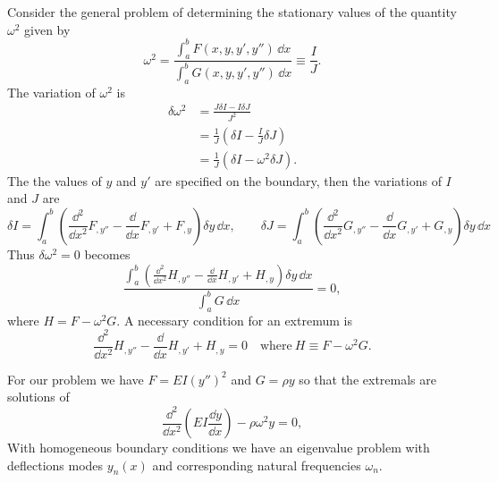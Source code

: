 \begin{Solution}
  Consider the general problem of determining the stationary values of
  the quantity $\omega^2$ given by
  \[
  \omega^2 = \frac{ \int_a^b F(x, y, y', y'' )\,\dd x }
  { \int_a^b G(x, y, y', y'' )\,\dd x }
  \equiv \frac{I}{J}.
  \]
  The variation of $\omega^2$ is
  \begin{align*}
    \delta \omega^2 
    &= \frac{ J \delta I - I \delta J }{J^2} \\
    &= \frac{1}{J} \left( \delta I - \frac{I}{J} \delta J \right) \\
    &= \frac{1}{J} \left( \delta I - \omega^2 \delta J \right).
  \end{align*}
  The the values of $y$ and $y'$ are specified on the boundary, then the 
  variations of $I$ and $J$ are
  \[
  \delta I = \int_a^b \left( \frac{\dd^2}{\dd x^2} F_{,y''} - \frac{\dd}{\dd x} F_{,y'}
    + F_{,y} \right) \delta y \,\dd x, \qquad
  \delta J = \int_a^b \left( \frac{\dd^2}{\dd x^2} G_{,y''} - \frac{\dd}{\dd x} G_{,y'}
    + G_{,y} \right) \delta y \,\dd x
  \]
  Thus $\delta \omega^2 = 0$ becomes
  \[
  \frac{ \int_a^b \left( \frac{\dd^2}{\dd x^2} H_{,y''} - \frac{\dd}{\dd x} H_{,y'}
      + H_{,y} \right) \delta y \,\dd x }{ \int_a^b G \,\dd x } = 0,
  \]
  where $H = F - \omega^2 G$.  A necessary condition for an extremum is
  \[
  \boxed{
    \frac{\dd^2}{\dd x^2} H_{,y''} - \frac{\dd}{\dd x} H_{,y'} + H_{,y} = 0 \quad
    \mathrm{where}\ H \equiv F - \omega^2 G.
    }
  \]

  For our problem we have $F = E I (y'')^2$ and $G = \rho y$ so that 
  the extremals are solutions of
  \[
  \frac{\dd^2}{\dd x^2} \left( E I \frac{\dd y}{\dd x} \right) - \rho \omega^2 y = 0,
  \]
  With homogeneous boundary conditions we have an eigenvalue problem with
  deflections modes $y_n(x)$ and corresponding natural frequencies
  $\omega_n$.
\end{Solution}



